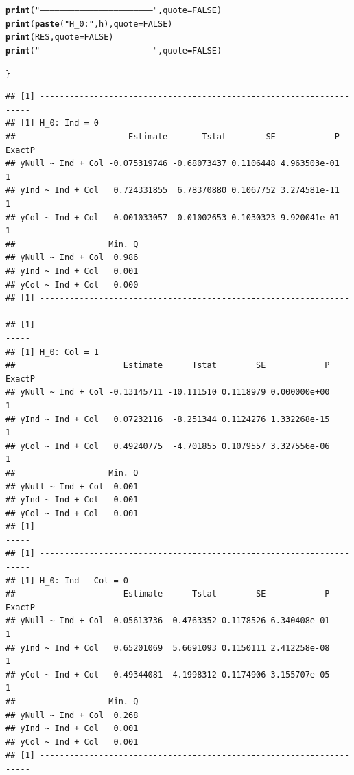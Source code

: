 \documentclass[11pt, a4paper]{article}\usepackage[]{graphicx}\usepackage[]{color}
\makeatletter
\newcommand{\hlnum}[1]{\textcolor[rgb]{0.686,0.059,0.569}{#1}}%
\newcommand{\hlstr}[1]{\textcolor[rgb]{0.192,0.494,0.8}{#1}}%
\newcommand{\hlstd}[1]{\textcolor[rgb]{0.345,0.345,0.345}{#1}}%
\newcommand{\hlkwc}[1]{\textcolor[rgb]{0.333,0.667,0.333}{#1}}%
\newcommand{\hlkwd}[1]{\textcolor[rgb]{0.737,0.353,0.396}{\textbf{#1}}}%
\newenvironment{kframe}{%
 \def\at@end@of@kframe{}%
 \ifinner\ifhmode%
  \def\at@end@of@kframe{\end{minipage}}%
  \begin{minipage}{\columnwidth}%
 \fi\fi%
 \def\FrameCommand##1{\hskip\@totalleftmargin \hskip-\fboxsep
 \colorbox{shadecolor}{##1}\hskip-\fboxsep
     \hskip-\linewidth \hskip-\@totalleftmargin \hskip\columnwidth}%
 \MakeFramed {\advance\hsize-\width
   \@totalleftmargin\z@ \linewidth\hsize
   \@setminipage}}%
 {\par\unskip\endMakeFramed%
 \at@end@of@kframe}
\newenvironment{knitrout}{}{} %
\makeatother
\begin{document}
\begin{footnotesize}
\begin{knitrout}
\begin{kframe}
\begin{alltt}
        \hlkwd{print}\hlstd{(}\hlstr{"--------------------------------------------------------------------"}\hlstd{,} \hlkwc{quote} \hlstd{=} \hlnum{FALSE}\hlstd{)}
        \hlkwd{print}\hlstd{(}\hlkwd{paste}\hlstd{(}\hlstr{"H_0:"}\hlstd{, h),} \hlkwc{quote} \hlstd{=} \hlnum{FALSE}\hlstd{)}
        \hlkwd{print}\hlstd{(RES,} \hlkwc{quote} \hlstd{=} \hlnum{FALSE}\hlstd{)}
        \hlkwd{print}\hlstd{(}\hlstr{"--------------------------------------------------------------------"}\hlstd{,} \hlkwc{quote} \hlstd{=} \hlnum{FALSE}\hlstd{)}

    \hlstd{\}}
\end{alltt}
\begin{verbatim}
## [1] --------------------------------------------------------------------
## [1] H_0: Ind = 0
##                       Estimate       Tstat        SE            P ExactP
## yNull ~ Ind + Col -0.075319746 -0.68073437 0.1106448 4.963503e-01      1
## yInd ~ Ind + Col   0.724331855  6.78370880 0.1067752 3.274581e-11      1
## yCol ~ Ind + Col  -0.001033057 -0.01002653 0.1030323 9.920041e-01      1
##                   Min. Q
## yNull ~ Ind + Col  0.986
## yInd ~ Ind + Col   0.001
## yCol ~ Ind + Col   0.000
## [1] --------------------------------------------------------------------
## [1] --------------------------------------------------------------------
## [1] H_0: Col = 1
##                      Estimate      Tstat        SE            P ExactP
## yNull ~ Ind + Col -0.13145711 -10.111510 0.1118979 0.000000e+00      1
## yInd ~ Ind + Col   0.07232116  -8.251344 0.1124276 1.332268e-15      1
## yCol ~ Ind + Col   0.49240775  -4.701855 0.1079557 3.327556e-06      1
##                   Min. Q
## yNull ~ Ind + Col  0.001
## yInd ~ Ind + Col   0.001
## yCol ~ Ind + Col   0.001
## [1] --------------------------------------------------------------------
## [1] --------------------------------------------------------------------
## [1] H_0: Ind - Col = 0
##                      Estimate      Tstat        SE            P ExactP
## yNull ~ Ind + Col  0.05613736  0.4763352 0.1178526 6.340408e-01      1
## yInd ~ Ind + Col   0.65201069  5.6691093 0.1150111 2.412258e-08      1
## yCol ~ Ind + Col  -0.49344081 -4.1998312 0.1174906 3.155707e-05      1
##                   Min. Q
## yNull ~ Ind + Col  0.268
## yInd ~ Ind + Col   0.001
## yCol ~ Ind + Col   0.001
## [1] --------------------------------------------------------------------
\end{verbatim}
\end{kframe}
\end{knitrout}


\end{footnotesize}
\end{document}
